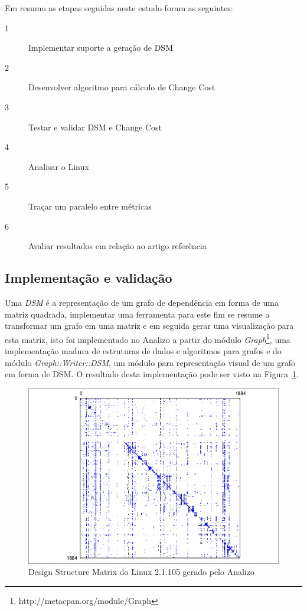 \documentclass[conference]{IEEEtran}
\begin{document}
Em resumo as etapas seguidas neste estudo foram as seguintes:

\begin{description}
  \item [1] Implementar suporte a geração de DSM
  \item [2] Desenvolver algoritmo para cálculo de Change Cost
  \item [3] Testar e validar DSM e Change Cost
  \item [4] Analisar o Linux
  \item [5] Traçar um paralelo entre métricas
  \item [6] Avaliar resultados em relação ao artigo referência\cite{ExploringStructure}
\end{description}

\subsection{Implementação e validação}

Uma {\it DSM} é a representação de um grafo de dependência em forma de uma
matriz quadrada, implementar uma ferramenta para este fim se resume a
transformar um grafo em uma matriz e em seguida gerar uma visualização para
esta matriz, isto foi implementado no Analizo a partir do módulo {\it
Graph}\footnote{http://metacpan.org/module/Graph}, uma implementação madura de
estruturas de dados e algoritmos para grafos e do módulo {\it
Graph::Writer::DSM}, um módulo para representação visual de um grafo em forma
de DSM. O resultado desta implementação pode ser visto na Figura~\ref{fig:dsm}.

\begin{figure}[h]
\center
\includegraphics[scale=0.3]{dsm.png}
\caption{Design Structure Matrix do Linux 2.1.105 gerado pelo Analizo}
\label{fig:dsm}
\end{figure}
\end{document}
